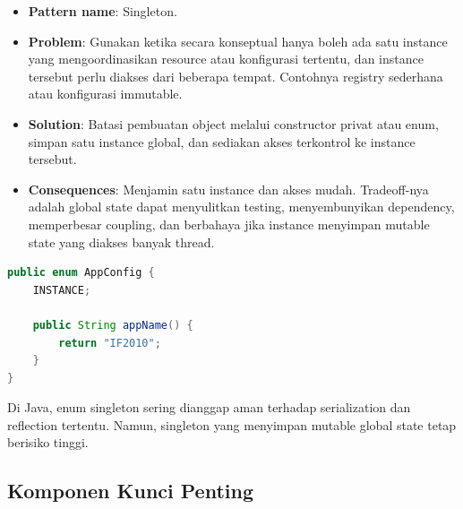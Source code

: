\begin{itemize}
    \item \textbf{Pattern name}: Singleton.
    \item \textbf{Problem}: Gunakan ketika secara konseptual hanya boleh ada satu instance yang mengoordinasikan resource atau konfigurasi tertentu, dan instance tersebut perlu diakses dari beberapa tempat. Contohnya registry sederhana atau konfigurasi immutable.
    \item \textbf{Solution}: Batasi pembuatan object melalui constructor privat atau enum, simpan satu instance global, dan sediakan akses terkontrol ke instance tersebut.
    \item \textbf{Consequences}: Menjamin satu instance dan akses mudah. Tradeoff-nya adalah global state dapat menyulitkan testing, menyembunyikan dependency, memperbesar coupling, dan berbahaya jika instance menyimpan mutable state yang diakses banyak thread.
\end{itemize}

\begin{lstlisting}[language=Java, caption={Singleton sederhana dengan enum}, label={lst:singleton-pattern}]
public enum AppConfig {
    INSTANCE;

    public String appName() {
        return "IF2010";
    }
}
\end{lstlisting}

Di Java, enum singleton sering dianggap aman terhadap serialization dan reflection tertentu. Namun, singleton yang menyimpan mutable global state tetap berisiko tinggi.

\subsection{Komponen Kunci Penting}

